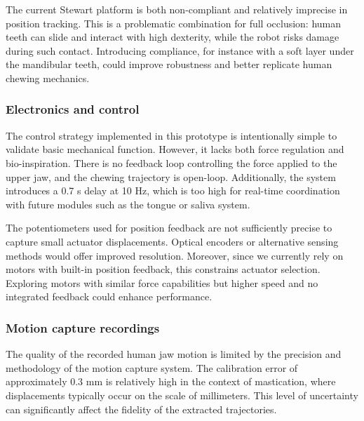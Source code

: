 The current Stewart platform is both non-compliant and relatively imprecise in position tracking. This is a problematic combination for full occlusion: human teeth 
can slide and interact with high dexterity, while the robot risks damage during such contact. Introducing compliance, for instance with a soft layer under the mandibular 
teeth, could improve robustness and better replicate human chewing mechanics.

\subsubsection{Electronics and control}
The control strategy implemented in this prototype is intentionally simple to validate basic mechanical function. However, it lacks both force regulation and 
bio-inspiration. There is no feedback loop controlling the force applied to the upper jaw, and the chewing trajectory is open-loop. Additionally, the system 
introduces a 0.7 s delay at 10 Hz, which is too high for real-time coordination with future modules such as the tongue or saliva system.

The potentiometers used for position feedback are not sufficiently precise to capture small actuator displacements. Optical encoders or alternative sensing methods 
would offer improved resolution. Moreover, since we currently rely on motors with built-in position feedback, this constrains actuator selection. Exploring motors 
with similar force capabilities but higher speed and no integrated feedback could enhance performance.

\subsubsection{Motion capture recordings}

The quality of the recorded human jaw motion is limited by the precision and methodology of the motion capture system. The calibration error of approximately $0.3$ mm is 
relatively high in the context of mastication, where displacements typically occur on the scale of millimeters. This level of uncertainty can significantly 
affect the fidelity of the extracted trajectories.

